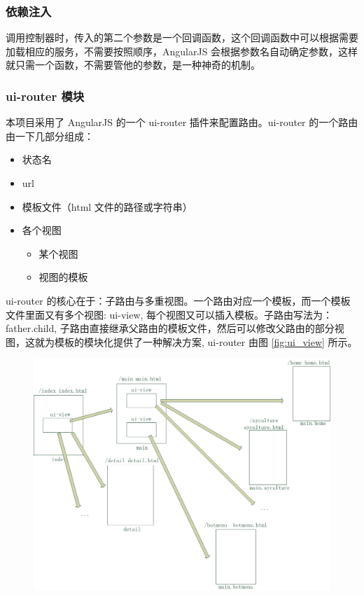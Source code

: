 \documentclass[UTF8]{ctexbook}
\begin{document}
{{            \subsubsection{依赖注入}
              \label{subsubsec:依赖注入}
                调用控制器时，传入的第二个参数是一个回调函数，这个回调函数中可以根据需要加载相应的服务，不需要按照顺序，AngularJS 会根据参数名自动确定参数，这样就只需一个函数，不需要管他的参数，是一种神奇的机制。

            \subsubsection{ui-router 模块}
              \label{subsubsec:ui_router_模块}
                本项目采用了 AngularJS 的一个 ui-router 插件来配置路由。ui-router 的一个路由由一下几部分组成：
                \begin{itemize}
                  \item 状态名
                  \item url
                  \item 模板文件（html 文件的路径或字符串）
                  \item 各个视图
                  \begin{itemize}
                    \item 某个视图
                    \item 视图的模板
                  \end{itemize}
                \end{itemize}
                ui-router 的核心在于：子路由与多重视图。一个路由对应一个模板，而一个模板文件里面又有多个视图: ui-view, 每个视图又可以插入模板。子路由写法为：father.child, 子路由直接继承父路由的模板文件，然后可以修改父路由的部分视图，这就为模板的模块化提供了一种解决方案, ui-router 由图 \ref{fig:ui_view} 所示。
                \begin{figure}[H]
                  \centering
                  \includegraphics[width=12cm]{./img/ui_view.png}

\end{figure}}}
\end{document}
